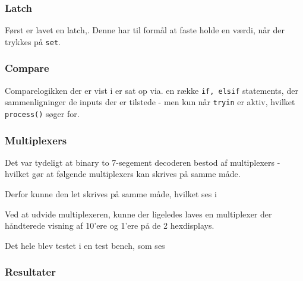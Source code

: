 {\subsubsection*{Latch}
Først er lavet en latch,. Denne har til formål at faste holde en værdi, når der trykkes på \texttt{set}.




\subsubsection*{Compare}
Comparelogikken der er vist i  er sat op via. en række \texttt{if, elsif} statements, der sammenligninger de inputs der er tilstede - men kun når \texttt{tryin} er aktiv, hvilket \texttt{process()} søger for.

\subsubsection*{Multiplexers}
Det var tydeligt at binary to 7-segement decoderen bestod af multiplexers - hvilket gør at følgende multiplexers kan skrives på samme måde.

Derfor kunne den let skrives på samme måde, hvilket ses i 

Ved at udvide multiplexeren, kunne der ligeledes laves en multiplexer der håndterede visning af 10'ere og 1'ere på de 2 hexdisplays.

Det hele blev testet i en test bench, som ses 

\subsubsection{Resultater}

}
